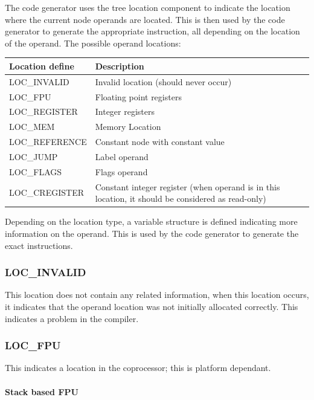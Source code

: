 \documentclass [a4paper,12pt]{article}
\begin{document}
The code generator uses the tree location component to indicate the location
where the current node operands are located. This is then used by the code
generator to generate the appropriate instruction, all depending on the
location of the operand. The possible operand locations:

\begin{longtable}{|l|p{10cm}|}
\hline
Location define & Description \\
\hline
\endhead
\hline
\endfoot
\textsf{LOC{\_}INVALID}&
    Invalid location (should never occur) \\
\textsf{LOC{\_}FPU}&
    Floating point registers \\
\textsf{LOC{\_}REGISTER}&
    Integer registers \\
\textsf{LOC{\_}MEM}&
    Memory Location \\
\textsf{LOC{\_}REFERENCE}&
    Constant node with constant value \\
\textsf{LOC{\_}JUMP}&
    Label operand \\
\textsf{LOC{\_}FLAGS}&
    Flags operand \\
\textsf{LOC{\_}CREGISTER}&
    Constant integer register (when operand is in this
    location, it should be considered as read-only) \\
\end{longtable}

Depending on the location type, a variable structure is defined indicating
more information on the operand. This is used by the code generator to
generate the exact instructions.

\subsubsection{LOC{\_}INVALID}
\label{subsubsec:mylabel18}

This location does not contain any related information, when this location
occurs, it indicates that the operand location was not initially allocated
correctly. This indicates a problem in the compiler.

\subsubsection{LOC{\_}FPU}
\label{subsubsec:mylabel19}

This indicates a location in the coprocessor; this is platform dependant.

\paragraph{Stack based FPU}
\end{document}
